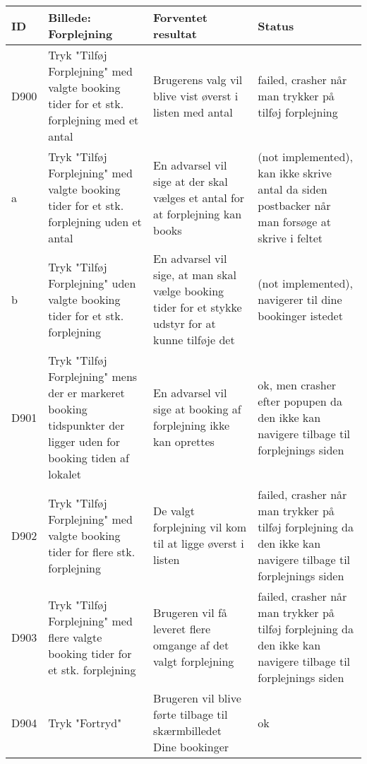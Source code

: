 \begin{tabularx}{\textwidth}{ |X|X|X|X| }
\hline
	ID & Billede: Forplejning  & Forventet resultat & Status\\ 
\hline
	D900 & Tryk "Tilføj Forplejning" med valgte booking tider for et stk. forplejning med et antal & Brugerens valg vil blive vist øverst i listen med antal & failed, crasher når man trykker på tilføj forplejning \\
\hline
	a & Tryk "Tilføj Forplejning" med valgte booking tider for et stk. forplejning uden et antal & En advarsel vil sige at der skal vælges et antal for at forplejning kan books &(not implemented), kan ikke skrive antal da siden postbacker når man forsøge at skrive i feltet \\
\hline
	b & Tryk "Tilføj Forplejning" uden valgte booking tider for et stk. forplejning & En advarsel vil sige, at man skal vælge booking tider for et stykke udstyr for at kunne tilføje det &(not implemented), navigerer til dine bookinger istedet \\
\hline
	D901 & Tryk "Tilføj Forplejning" mens der er markeret booking tidspunkter der ligger uden for booking tiden af lokalet & En advarsel vil sige at booking af forplejning ikke kan oprettes & ok, men crasher efter popupen da den ikke kan navigere tilbage til forplejnings siden \\
\hline
	D902 & Tryk "Tilføj Forplejning" med valgte booking tider for flere stk. forplejning & De valgt forplejning vil kom til at ligge øverst i listen & failed, crasher når man trykker på tilføj forplejning da den ikke kan navigere tilbage til forplejnings siden \\
\hline
	D903 & Tryk "Tilføj Forplejning" med flere valgte booking tider for et stk. forplejning & Brugeren vil få leveret flere omgange af det valgt forplejning & failed, crasher når man trykker på tilføj forplejning da den ikke kan navigere tilbage til forplejnings siden\\
\hline
	D904 & Tryk "Fortryd" & Brugeren vil blive førte tilbage til skærmbilledet Dine bookinger & ok \\
\hline
\end{tabularx}

